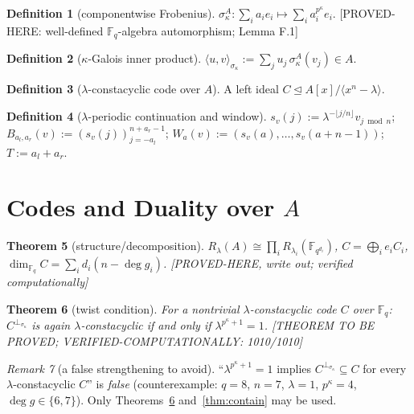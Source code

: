 \documentclass[11pt]{article}
\newtheorem{theorem}{Theorem}[section]
\theoremstyle{definition}
\newtheorem{definition}[theorem]{Definition}
\theoremstyle{remark}
\newtheorem{remark}[theorem]{Remark}
\theoremstyle{plain}
\newcommand{\Fq}{\mathbb{F}_q}
\newcommand{\Fqi}{\mathbb{F}_{q^{d_i}}}
\newcommand{\Aalg}{A}
\newcommand{\Rlam}{R_{\lambda}}
\newcommand{\perpsig}{^{\perp_{\sigma_\kappa}}}
\newcommand{\Tol}{T}
\begin{document}
\begin{definition}[componentwise Frobenius]\label{def:frob}
$\sigma_\kappa^{\Aalg}\colon\sum_i a_ie_i\longmapsto\sum_i a_i^{p^\kappa}e_i$.
\textnormal{[PROVED-HERE: well-defined $\Fq$-algebra automorphism; Lemma F.1]}
\end{definition}

\begin{definition}[$\kappa$-Galois inner product]\label{def:ip}
$\langle u,v\rangle_{\sigma_\kappa}:=\sum_{j}u_j\,\sigma_\kappa^{\Aalg}(v_j)\in\Aalg$.
\end{definition}

\begin{definition}[$\lambda$-constacyclic code over $\Aalg$]\label{def:constacyc}
A left ideal $C\trianglelefteq \Aalg[x]/\langle x^n-\lambda\rangle$.
\end{definition}

\begin{definition}[$\lambda$-periodic continuation and window]\label{def:pad}
$s_v(j):=\lambda^{-\lfloor j/n\rfloor}v_{j\bmod n}$;
$B_{a_l,a_r}(v):=(s_v(j))_{j=-a_l}^{n+a_r-1}$;
$W_a(v):=(s_v(a),\dots,s_v(a+n-1))$;
$\Tol:=a_l+a_r$.
\end{definition}

\section{Codes and Duality over $\Aalg$}\label{sec:duality}

\begin{theorem}[structure/decomposition]\label{thm:struct}
$\Rlam(\Aalg)\cong\prod_i R_{\lambda_i}(\Fqi)$, $C=\bigoplus_ie_iC_i$,
$\dim_{\Fq}C=\sum_id_i(n-\deg g_i)$.
\textnormal{[PROVED-HERE, write out; verified computationally]}
\end{theorem}

\begin{theorem}[twist condition]\label{thm:twist}
For a nontrivial $\lambda$-constacyclic code $C$ over $\Fq$: $C\perpsig$ is again
$\lambda$-constacyclic if and only if $\lambda^{p^\kappa+1}=1$.
\textnormal{[THEOREM TO BE PROVED; VERIFIED-COMPUTATIONALLY: 1010/1010]}
\end{theorem}

\begin{remark}[a false strengthening to avoid]\label{rem:nofalse}
``$\lambda^{p^\kappa+1}=1$ implies $C\perpsig\subseteq C$ for every $\lambda$-constacyclic
$C$'' is \emph{false} (counterexample: $q=8$, $n=7$, $\lambda=1$, $p^\kappa=4$,
$\deg g\in\{6,7\}$). Only Theorems~\ref{thm:twist} and~\ref{thm:contain} may be used.
\end{remark}
\end{document}
